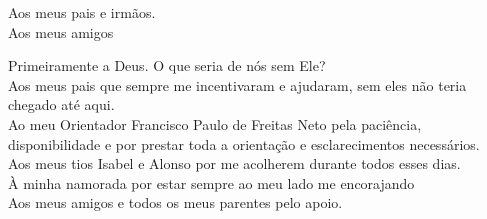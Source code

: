 \documentclass[a4paper,12pt]{monografia}
\begin{document}
%
  
%
\tecnologo {} 
%
 
\unidadeacademica{}
%
%

\maketitle
\begin{dedicatoria}
Aos meus pais e irmãos.\\
Aos meus amigos\\
\end{dedicatoria}

\noindent Primeiramente a Deus. O que seria de nós sem Ele?	\\
Aos meus pais que sempre me incentivaram e ajudaram, sem eles não teria chegado até aqui.\\
Ao meu Orientador Francisco Paulo de Freitas Neto pela paciência, disponibilidade e por prestar toda a orientação e esclarecimentos necessários.\\
Aos meus tios Isabel e Alonso por me acolherem durante todos esses dias.\\
À minha namorada por estar sempre ao meu lado me encorajando\\
Aos meus amigos e todos os meus parentes pelo apoio.

\newpage

\end{document}
